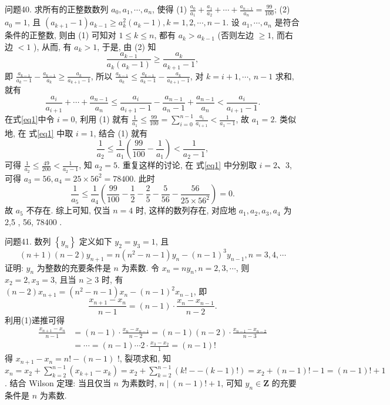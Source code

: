 问题40. 求所有的正整数数列 $a_0, a_1, \cdots, a_n$, 使得
(1) $\frac{a_0}{a_1}+\frac{a_1}{a_2}+\cdots+\frac{a_{n-1}}{a_n}=\frac{99}{100}$;
(2) $a_0=1$, 且 $\left(a_{k+1}-1\right) a_{k-1} \geqslant a_k^2\left(a_k-1\right), k=1,2, \cdots, n-1$.
设 $a_1, \cdots, a_n$ 是符合条件的正整数, 则由 (1) 可知对 $1 \leqslant k \leqslant n$, 都有 $a_k>a_{k-1}$ (否则左边 $\geqslant 1$, 而右边 $<1$ ), 从而, 有 $a_k>1$, 于是, 由 (2) 知
$$
\frac{a_{k-1}}{a_k\left(a_k-1\right)} \geqslant \frac{a_k}{a_{k+1}-1},
$$
即 $\frac{a_{k-1}}{a_k-1}-\frac{a_{k-1}}{a_k} \geqslant \frac{a_k}{a_{k+1}-1}$, 所以 $\frac{a_{k-1}}{a_k} \leqslant \frac{a_{k-1}}{a_k-1}-\frac{a_k}{a_{k+1}-1}$, 对 $k=i+1, \cdots$,
$n-1$ 求和, 就有
$$
\frac{a_i}{a_{i+1}}+\cdots+\frac{a_{n-1}}{a_n} \leqslant \frac{a_i}{a_{i+1}-1}-\frac{a_{n-1}}{a_n-1}+\frac{a_{n-1}}{a_n}<\frac{a_i}{a_{i+1}-1} . \label{eq1}
$$
在式\ref{eq1}中令 $i=0$, 利用 (1) 就有 $\frac{1}{a_1} \leqslant \frac{99}{100}=\sum_{i=0}^{n-1} \frac{a_i}{a_{i+1}}<\frac{1}{a_1-1}$, 故 $a_1=2$. 类似地, 在 式\ref{eq1} 中取 $i=1$, 结合 (1) 就有
$$
\frac{1}{a_2} \leqslant \frac{1}{a_1}\left(\frac{99}{100}-\frac{1}{a_1}\right)<\frac{1}{a_2-1},
$$
可得 $\frac{1}{a_2} \leqslant \frac{49}{200}<\frac{1}{a_2-1}$, 知 $a_2=5$. 重复这样的讨论, 在 式\ref{eq1} 中分别取 $i=2 、 3$, 可得 $a_3=56, a_4=25 \times 56^2=78400$. 此时
$$
\frac{1}{a_5} \leqslant \frac{1}{a_4}\left(\frac{99}{100}-\frac{1}{2}-\frac{2}{5}-\frac{5}{56}-\frac{56}{25 \times 56^2}\right)=0 .
$$
故 $a_5$ 不存在.
综上可知, 仅当 $n=4$ 时, 这样的数列存在, 对应地 $a_1, a_2, a_3, a_4$ 为 2,5 , 56, 78400 .



问题41. 数列 $\left\{y_n\right\}$ 定义如下 $y_2=y_3=1$, 且
$$
(n+1)(n-2) y_{n+1}=n\left(n^2-n-1\right) y_n-(n-1)^3 y_{n-1}, n=3,4, \cdots
$$
证明: $y_n$ 为整数的充要条件是 $n$ 为素数.
令 $x_n=n y_n, n=2,3, \cdots$, 则 $x_2=2, x_3=3$, 且当 $n \geqslant 3$ 时, 有 $(n-2) x_{n+1}=\left(n^2-n-1\right) x_n-(n-1)^2 x_{n-1}$, 即
$$
\frac{x_{n+1}-x_n}{n-1}=(n-1) \cdot \frac{x_n-x_{n-1}}{n-2} . \label{(1)}
$$
利用(1)递推可得
$$
\begin{aligned}
\frac{x_{n+1}-x_n}{n-1} & =(n-1) \cdot \frac{x_n-x_{n-1}}{n-2}=(n-1)(n-2) \cdot \frac{x_{n-1}-x_{n-2}}{n-3} \\
& =\cdots=(n-1) \cdots 2 \cdot \frac{x_3-x_2}{1}=(n-1) !
\end{aligned}
$$
得 $x_{n+1}-x_n=n !-(n-1)$ !, 裂项求和, 知 $x_n=x_2+\sum_{k=2}^{n-1}\left(x_{k+1}-x_k\right)=x_2+ \sum_{k=2}^{n-1}(k !--(k-1) !)=x_2+(n-1) !-1=(n-1) !+1$.
结合 Wilson 定理: 当且仅当 $n$ 为素数时, $n \mid(n-1) !+1$, 可知 $y_n \in \mathbf{Z}$ 的充要条件是 $n$ 为素数.



